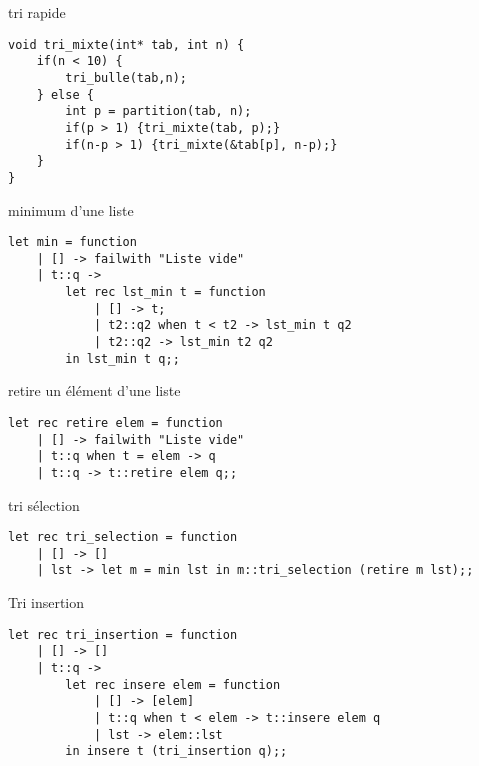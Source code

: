 \begin{imp*}{tri rapide}
\begin{verbatim}
void tri_mixte(int* tab, int n) {
    if(n < 10) {
        tri_bulle(tab,n);
    } else {
        int p = partition(tab, n);
        if(p > 1) {tri_mixte(tab, p);}
        if(n-p > 1) {tri_mixte(&tab[p], n-p);}
    }
}
\end{verbatim}
\end{imp*}
\ocaml
\begin{imp*}{minimum d'une liste}
\begin{verbatim}
let min = function
    | [] -> failwith "Liste vide"
    | t::q ->
        let rec lst_min t = function
            | [] -> t;
            | t2::q2 when t < t2 -> lst_min t q2
            | t2::q2 -> lst_min t2 q2
        in lst_min t q;;
\end{verbatim}
\end{imp*}
\begin{imp*}{retire un élément d'une liste}
\begin{verbatim}
let rec retire elem = function
    | [] -> failwith "Liste vide"
    | t::q when t = elem -> q
    | t::q -> t::retire elem q;;
\end{verbatim}
\end{imp*}
\begin{imp*}{tri sélection}
\begin{verbatim}
let rec tri_selection = function
    | [] -> []
    | lst -> let m = min lst in m::tri_selection (retire m lst);;
\end{verbatim}
\end{imp*}
\begin{imp*}{Tri insertion}
\begin{verbatim}
let rec tri_insertion = function
    | [] -> []
    | t::q ->
        let rec insere elem = function
            | [] -> [elem]
            | t::q when t < elem -> t::insere elem q
            | lst -> elem::lst
        in insere t (tri_insertion q);;
\end{verbatim}
\end{imp*}
